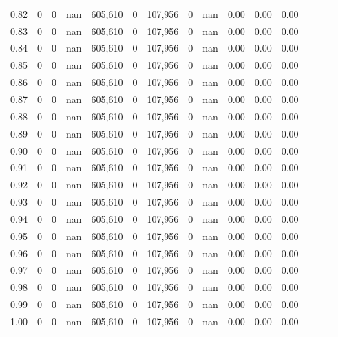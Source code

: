 \begin{tabular}{rrrrrrrrrrrrrrr}
0.82 &        0 &       0 &   nan &  605,610 &        0 &  107,956 &        0 &   nan &  0.00 &  0.00 &      0.00 \\
0.83 &        0 &       0 &   nan &  605,610 &        0 &  107,956 &        0 &   nan &  0.00 &  0.00 &      0.00 \\
0.84 &        0 &       0 &   nan &  605,610 &        0 &  107,956 &        0 &   nan &  0.00 &  0.00 &      0.00 \\
0.85 &        0 &       0 &   nan &  605,610 &        0 &  107,956 &        0 &   nan &  0.00 &  0.00 &      0.00 \\
0.86 &        0 &       0 &   nan &  605,610 &        0 &  107,956 &        0 &   nan &  0.00 &  0.00 &      0.00 \\
0.87 &        0 &       0 &   nan &  605,610 &        0 &  107,956 &        0 &   nan &  0.00 &  0.00 &      0.00 \\
0.88 &        0 &       0 &   nan &  605,610 &        0 &  107,956 &        0 &   nan &  0.00 &  0.00 &      0.00 \\
0.89 &        0 &       0 &   nan &  605,610 &        0 &  107,956 &        0 &   nan &  0.00 &  0.00 &      0.00 \\
0.90 &        0 &       0 &   nan &  605,610 &        0 &  107,956 &        0 &   nan &  0.00 &  0.00 &      0.00 \\
0.91 &        0 &       0 &   nan &  605,610 &        0 &  107,956 &        0 &   nan &  0.00 &  0.00 &      0.00 \\
0.92 &        0 &       0 &   nan &  605,610 &        0 &  107,956 &        0 &   nan &  0.00 &  0.00 &      0.00 \\
0.93 &        0 &       0 &   nan &  605,610 &        0 &  107,956 &        0 &   nan &  0.00 &  0.00 &      0.00 \\
0.94 &        0 &       0 &   nan &  605,610 &        0 &  107,956 &        0 &   nan &  0.00 &  0.00 &      0.00 \\
0.95 &        0 &       0 &   nan &  605,610 &        0 &  107,956 &        0 &   nan &  0.00 &  0.00 &      0.00 \\
0.96 &        0 &       0 &   nan &  605,610 &        0 &  107,956 &        0 &   nan &  0.00 &  0.00 &      0.00 \\
0.97 &        0 &       0 &   nan &  605,610 &        0 &  107,956 &        0 &   nan &  0.00 &  0.00 &      0.00 \\
0.98 &        0 &       0 &   nan &  605,610 &        0 &  107,956 &        0 &   nan &  0.00 &  0.00 &      0.00 \\
0.99 &        0 &       0 &   nan &  605,610 &        0 &  107,956 &        0 &   nan &  0.00 &  0.00 &      0.00 \\
1.00 &        0 &       0 &   nan &  605,610 &        0 &  107,956 &        0 &   nan &  0.00 &  0.00 &      0.00 \\
\bottomrule
\end{tabular}
